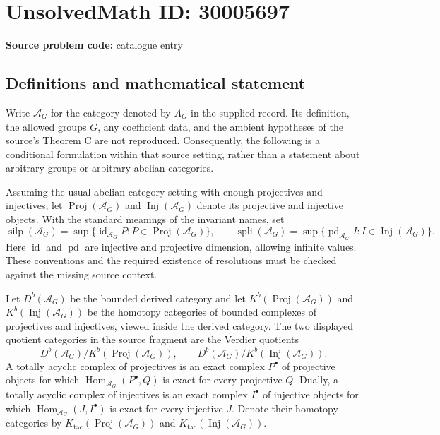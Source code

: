 \documentclass[11pt]{article}
\begin{document}
\section*{UnsolvedMath ID: 30005697}
\textbf{Source problem code:} catalogue entry
\subsection{Definitions and mathematical statement}
Write \(\mathcal A_G\) for the category denoted by \(A_G\) in the supplied record. Its definition, the allowed groups \(G\), any coefficient data, and the ambient hypotheses of the source's Theorem C are not reproduced. Consequently, the following is a conditional formulation within that source setting, rather than a statement about arbitrary groups or arbitrary abelian categories.

Assuming the usual abelian-category setting with enough projectives and injectives, let \(\operatorname{Proj}(\mathcal A_G)\) and \(\operatorname{Inj}(\mathcal A_G)\) denote its projective and injective objects. With the standard meanings of the invariant names, set
\[
\operatorname{silp}(\mathcal A_G)=\sup\{\operatorname{id}_{\mathcal A_G}P:P\in\operatorname{Proj}(\mathcal A_G)\},\qquad
\operatorname{spli}(\mathcal A_G)=\sup\{\operatorname{pd}_{\mathcal A_G}I:I\in\operatorname{Inj}(\mathcal A_G)\}.
\]
Here \(\operatorname{id}\) and \(\operatorname{pd}\) are injective and projective dimension, allowing infinite values. These conventions and the required existence of resolutions must be checked against the missing source context.

Let \(D^b(\mathcal A_G)\) be the bounded derived category and let \(K^b(\operatorname{Proj}(\mathcal A_G))\) and \(K^b(\operatorname{Inj}(\mathcal A_G))\) be the homotopy categories of bounded complexes of projectives and injectives, viewed inside the derived category. The two displayed quotient categories in the source fragment are the Verdier quotients
\[
D^b(\mathcal A_G)/K^b(\operatorname{Proj}(\mathcal A_G)),\qquad
D^b(\mathcal A_G)/K^b(\operatorname{Inj}(\mathcal A_G)).
\]
A totally acyclic complex of projectives is an exact complex \(P^\bullet\) of projective objects for which \(\operatorname{Hom}_{\mathcal A_G}(P^\bullet,Q)\) is exact for every projective \(Q\). Dually, a totally acyclic complex of injectives is an exact complex \(I^\bullet\) of injective objects for which \(\operatorname{Hom}_{\mathcal A_G}(J,I^\bullet)\) is exact for every injective \(J\). Denote their homotopy categories by \(K_{\mathrm{tac}}(\operatorname{Proj}(\mathcal A_G))\) and \(K_{\mathrm{tac}}(\operatorname{Inj}(\mathcal A_G))\).
\end{document}
